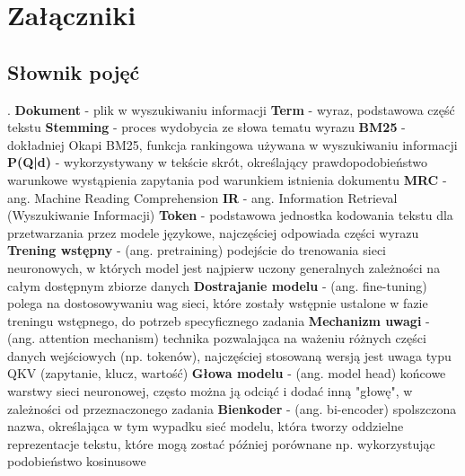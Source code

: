 \chapter*{Załączniki}
\label{chap:zalaczniki}

\section{Słownik pojęć}

.\newline
\textbf{Dokument} - plik w wyszukiwaniu informacji\newline
\textbf{Term} - wyraz, podstawowa część tekstu\newline
\textbf{Stemming} - proces wydobycia ze słowa tematu wyrazu\newline
\textbf{BM25} - dokładniej Okapi BM25, funkcja rankingowa używana w wyszukiwaniu informacji\newline
\textbf{P(Q|d)} - wykorzystywany w tekście skrót, określający prawdopodobieństwo warunkowe wystąpienia zapytania pod warunkiem istnienia dokumentu\newline
\textbf{MRC} - ang. Machine Reading Comprehension\newline
\textbf{IR} - ang. Information Retrieval (Wyszukiwanie Informacji)\newline
\textbf{Token} - podstawowa jednostka kodowania tekstu dla przetwarzania przez modele językowe, najczęściej odpowiada części wyrazu\newline 
\textbf{Trening wstępny} - (ang. pretraining) podejście do trenowania sieci neuronowych, w których model jest najpierw uczony generalnych zależności na całym dostępnym zbiorze danych\newline
\textbf{Dostrajanie modelu} - (ang. fine-tuning) polega na dostosowywaniu wag sieci, które zostały wstępnie ustalone w fazie treningu wstępnego, do potrzeb specyficznego zadania\newline
\textbf{Mechanizm uwagi} - (ang. attention mechanism) technika pozwalająca na ważeniu różnych części danych wejściowych (np. tokenów), najczęściej stosowaną wersją jest uwaga typu QKV (zapytanie, klucz, wartość)\newline
\textbf{Głowa modelu} - (ang. model head) końcowe warstwy sieci neuronowej, często można ją odciąć i dodać inną "głowę", w zależności od przeznaczonego zadania\newline 
\textbf{Bienkoder} - (ang. bi-encoder) spolszczona nazwa, określająca w tym wypadku sieć modelu, która tworzy oddzielne reprezentacje tekstu, które mogą zostać później porównane np. wykorzystując podobieństwo kosinusowe
\newline


